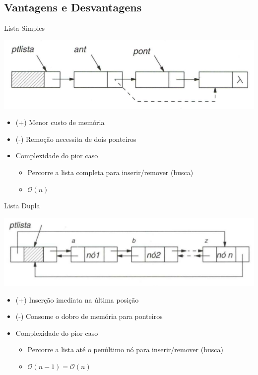 \documentclass[bigger]{beamer}
\begin{document}
\subsection{Vantagens e Desvantagens}
\label{sec-1-3}
\begin{frame}[label=sec-1-3-1]{Lista Simples}
\begin{center}
\includegraphics[width=.9\linewidth]{fig/listasimple.png}
\end{center}
\begin{itemize}
\item (+) Menor custo de memória
\item (-) Remoção necessita de dois ponteiros
\item Complexidade do pior caso
\begin{itemize}
\item Percorre a lista completa para inserir/remover (busca)
\item $\mathcal{O}(n)$
\end{itemize}
\end{itemize}
\end{frame}
\begin{frame}[label=sec-1-3-2]{Lista Dupla}
\begin{center}
\includegraphics[width=.9\linewidth]{fig/listadoble.png}
\end{center}
\begin{itemize}
\item (+) Inserção imediata na última posição
\item (-) Consome o \alert{dobro} de memória para ponteiros
\item Complexidade do pior caso
\begin{itemize}
\item Percorre a lista até o penúltimo nó para inserir/remover (busca)
\item $\mathcal{O}(n - 1) = \mathcal{O}(n)$
\end{itemize}
\end{itemize}
\end{frame}
\end{document}

